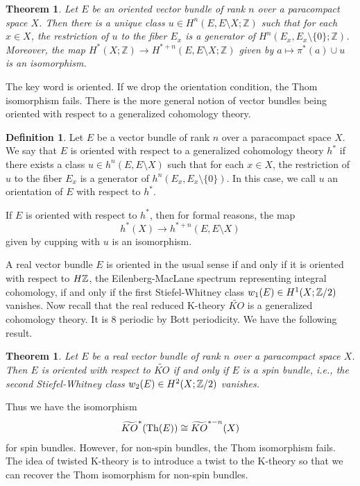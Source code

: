 \documentclass{amsart}
\numberwithin{equation}{section}
\theoremstyle{plain} %
\newtheorem{theorem}[equation]{Theorem}
\theoremstyle{definition}
\newtheorem{definition}[equation]{Definition}
\theoremstyle{remark}
\begin{document}
\begin{theorem}
Let $E$ be an oriented vector bundle of rank $n$ over a paracompact space $X$. Then there is a unique class $u \in H^n(E, E\setminus X; \mathbb{Z})$ such that for each $x \in X$, the restriction of $u$ to the fiber $E_x$ is a generator of $H^n(E_x, E_x\setminus \{0\}; \mathbb{Z})$. Moreover, the map $H^*(X; \mathbb{Z}) \to H^{*+n}(E, E\setminus X; \mathbb{Z})$ given by $a \mapsto \pi^*(a) \cup u$ is an isomorphism.
\end{theorem}

The key word is oriented. If we drop the orientation condition, the Thom isomorphism fails. There is the more general notion of vector bundles being oriented with respect to a generalized cohomology theory. 

\begin{definition}
Let $E$ be a vector bundle of rank $n$ over a paracompact space $X$. We say that $E$ is oriented with respect to a generalized cohomology theory $h^*$ if there exists a class $u \in h^n(E, E\setminus X)$ such that for each $x \in X$, the restriction of $u$ to the fiber $E_x$ is a generator of $h^n(E_x, E_x\setminus \{0\})$. In this case, we call $u$ an orientation of $E$ with respect to $h^*$.
\end{definition}
If $E$ is oriented with respect to $h^*$, then for formal reasons, the map \[h^*(X) \to h^{*+n}(E, E\setminus X)\] given by cupping with $u$ is an isomorphism. 

A real vector bundle $E$ is oriented in the usual sense if and only if it is oriented with respect to $H \mathbb{Z}$, the Eilenberg-MacLane spectrum representing integral cohomology, if and only if the first Stiefel-Whitney class $w_1(E) \in H^1(X; \mathbb{Z}/2)$ vanishes.
Now recall that the real reduced K-theory $\widetilde{KO}$ is a generalized cohomology theory. It is $8$ periodic by Bott periodicity. We have the following result.

\begin{theorem}
Let $E$ be a real vector bundle of rank $n$ over a paracompact space $X$. Then $E$ is oriented with respect to $\widetilde{KO}$ if and only if $E$ is a spin bundle, i.e., the second Stiefel-Whitney class $w_2(E) \in H^2(X; \mathbb{Z}/2)$ vanishes.
\end{theorem}

Thus we have the isomorphism \begin{align*}
    \widetilde{KO}^*(\operatorname{Th}(E)) \cong \widetilde{KO}^{*-n}(X)
\end{align*} for spin bundles. However, for non-spin bundles, the Thom isomorphism fails. The idea of twisted K-theory is to introduce a twist to the K-theory so that we can recover the Thom isomorphism for non-spin bundles.
\end{document}
